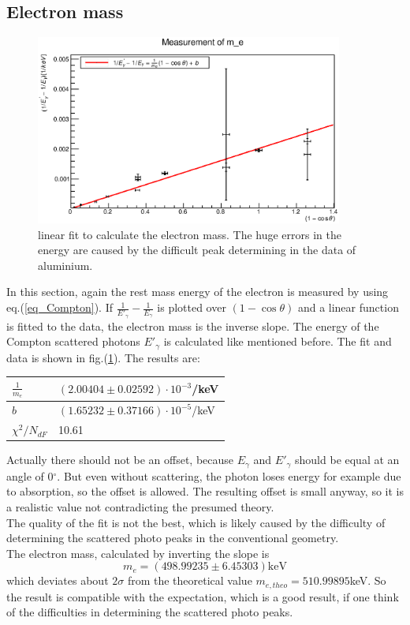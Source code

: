 \documentclass{article}
\begin{document}
\subsection{Electron mass}
\begin{figure}[H]
    \centering
    \includegraphics[width=0.9\textwidth]{Graphen/e_mass/e_mass_compton.eps}
    \caption{linear fit to calculate the electron mass. The huge errors in the energy are caused by the difficult peak determining in the data of aluminium.}
    \label{e_mass_compton}
\end{figure}
In this section, again the rest mass energy of the electron is measured by using eq.(\ref{eq_Compton}). If $\frac{1}{E'_\gamma}-\frac{1}{E_\gamma}$ is plotted over $(1-\cos{\theta})$ and a linear function is fitted to the data, the electron mass is the inverse slope. The energy of the Compton scattered photons $E'_\gamma$ is calculated like mentioned before. The fit and data is shown in fig.(\ref{e_mass_compton}). The results are:
\begin{table}[H]
    \centering
    \begin{tabular}{l|l}
        $\frac{1}{m_e}$ & $(2.00404 \pm  0.02592)\cdot 10^{-3}$/keV\\\hline
        $b$ & $(1.65232 \pm  0.37166)\cdot 10^{-5}$/keV \\\hline
        $\chi^2/N_{dF}$ & 10.61
    \end{tabular}
\end{table}
Actually there should not be an offset, because $E_\gamma$ and $E'_\gamma$ should be equal at an angle of 0$^\circ$. But even without scattering, the photon loses energy for example due to absorption, so the offset is allowed. The resulting offset is small anyway, so it is a realistic value not contradicting the presumed theory.\\
The quality of the fit is not the best, which is likely caused by the difficulty of determining the scattered photo peaks in the conventional geometry.\\
The electron mass, calculated by inverting the slope is
\begin{equation*}
    m_e =  (498.99235 \pm  6.45303)\mbox{keV}
\end{equation*}
which deviates about $2 \sigma$ from the theoretical value $m_{e, theo} = 510.99895$keV. So the result is compatible with the expectation, which is a good result, if one think of the difficulties in determining the scattered photo peaks.
\end{document}
